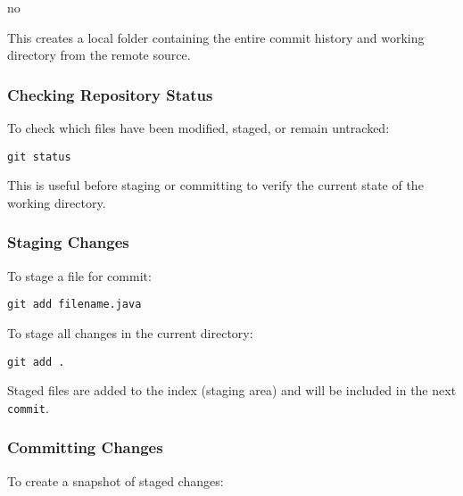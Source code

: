 no\documentclass{article}
\newcommand{\codecmd}[1]{\textcolor[rgb]{0,0.5,0}{\texttt{#1}}}
\begin{document}
\noindent This creates a local folder containing the entire commit history and working directory from the remote source.

\subsubsection{Checking Repository Status}

To check which files have been modified, staged, or remain untracked:

\begin{tcolorbox}[colback=mintgreen, colframe=green!40!black, boxrule=0.5pt, sharp corners]
\begin{verbatim}
git status
\end{verbatim}
\end{tcolorbox}

\noindent This is useful before staging or committing to verify the current state of the working directory.

\subsubsection{Staging Changes}

To stage a file for commit:

\begin{tcolorbox}[colback=mintgreen, colframe=green!40!black, boxrule=0.5pt, sharp corners]
\begin{verbatim}
git add filename.java
\end{verbatim}
\end{tcolorbox}

\noindent To stage all changes in the current directory:

\begin{tcolorbox}[colback=mintgreen, colframe=green!40!black, boxrule=0.5pt, sharp corners]
\begin{verbatim}
git add .
\end{verbatim}
\end{tcolorbox}

\noindent Staged files are added to the index (staging area) and will be included in the next \codecmd{commit}.

\subsubsection{Committing Changes}

To create a snapshot of staged changes:
\end{document}
